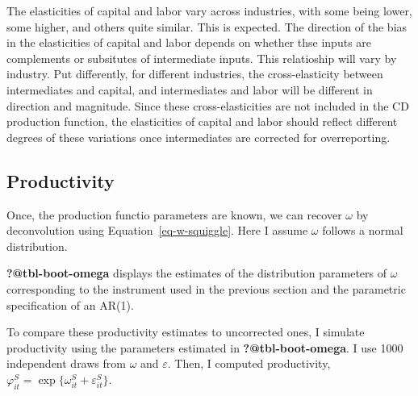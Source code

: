 \documentclass[
  12pt]{article}
\theoremstyle{definition}
\theoremstyle{remark}
\begin{document}
The elasticities of capital and labor vary across industries, with some
being lower, some higher, and others quite similar. This is expected.
The direction of the bias in the elasticities of capital and labor
depends on whether thse inputs are complements or subsitutes of
intermediate inputs. This relatioship will vary by industry. Put
differently, for different industries, the cross-elasticity between
intermediates and capital, and intermediates and labor will be different
in direction and magnitude. Since these cross-elasticities are not
included in the CD production function, the elasticities of capital and
labor should reflect different degrees of these variations once
intermediates are corrected for overreporting.

\subsection{Productivity}\label{productivity}

Once, the production functio parameters are known, we can recover
\(\omega\) by deconvolution using Equation~\ref{eq-w-squiggle}. Here I
assume \(\omega\) follows a normal distribution.

\textbf{?@tbl-boot-omega} displays the estimates of the distribution
parameters of \(\omega\) corresponding to the instrument used in the
previous section and the parametric specification of an AR(1).

\begin{table}

\caption{\label{tbl-omega}Estimates Omega Distribution by Industry after
Deconvoluting from the Output Shock.}


\end{table}%

To compare these productivity estimates to uncorrected ones, I simulate
productivity using the parameters estimated in
\textbf{?@tbl-boot-omega}. I use 1000 independent draws from \(\omega\)
and \(\varepsilon\). Then, I computed productivity,
\(\varphi_{it}^S=\exp\{\omega_{it}^S+\varepsilon_{it}^S\}\).
\end{document}
